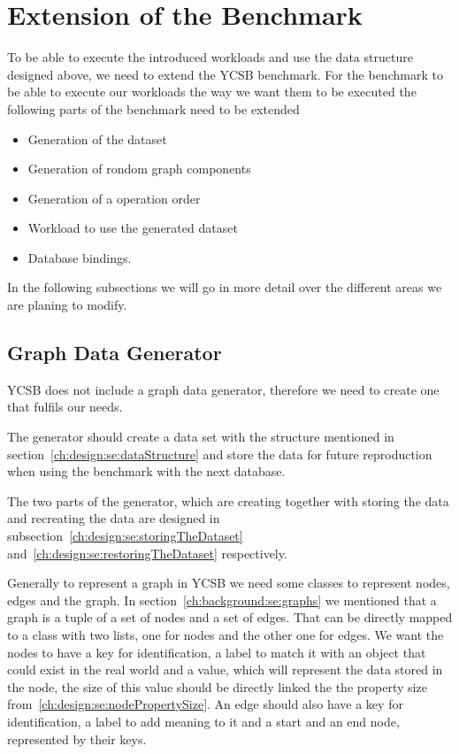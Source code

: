 \section{Extension of the Benchmark}
\label{ch:design:se:extensionOfTheBenchmark}
To be able to execute the introduced workloads and use the data structure designed above,
we need to extend the YCSB benchmark.
For the benchmark to be able to execute our workloads the way we want them to be executed the following parts of the benchmark need to be extended

\begin{itemize}
  \item Generation of the dataset
  \item Generation of rondom graph components
  \item Generation of a operation order
  \item Workload to use the generated dataset
  \item Database bindings.
\end{itemize}

In the following subsections we will go in more detail over the different areas we are planing to modify.

\subsection{Graph Data Generator}
YCSB does not include a graph data generator,
therefore we need to create one that fulfils our needs.

The generator should create a data set with the structure mentioned in section~\ref{ch:design:se:dataStructure} and store the data for future reproduction when using the benchmark with the next database.

The two parts of the generator,
which are creating together with storing the data and recreating the data are designed in subsection~\ref{ch:design:se:storingTheDataset} and~\ref{ch:design:se:restoringTheDataset} respectively.

Generally to represent a graph in YCSB we need some classes to represent nodes, edges and the graph.
In section~\ref{ch:background:se:graphs} we mentioned that a graph is a tuple of a set of nodes and a set of edges.
That can be directly mapped to a class with two lists,
one for nodes and the other one for edges.
We want the nodes to have a key for identification,
a label to match it with an object that could exist in the real world and a value,
which will represent the data stored in the node,
the size of this value should be directly linked the the property size from~\ref{ch:design:se:nodePropertySize}.
An edge should also have a key for identification,
a label to add meaning to it and a start and an end node,
represented by their keys.

